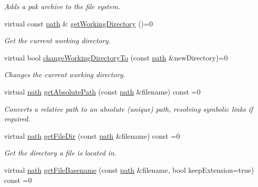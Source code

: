 \begin{DoxyCompactItemize}
\begin{DoxyCompactList}\small\item\em Adds a pak archive to the file system. \end{DoxyCompactList}\item 
virtual const \hyperlink{namespaceirr_1_1io_a6468281622ce3a1c46b72e19f32dded5}{path} \& \hyperlink{classirr_1_1io_1_1IFileSystem_acbf7342afa6e2fc9583db3e521e66e61}{get\+Working\+Directory} ()=0
\begin{DoxyCompactList}\small\item\em Get the current working directory. \end{DoxyCompactList}\item 
virtual bool \hyperlink{classirr_1_1io_1_1IFileSystem_a8859a2bed44815eeccc4fbcef189b073}{change\+Working\+Directory\+To} (const \hyperlink{namespaceirr_1_1io_a6468281622ce3a1c46b72e19f32dded5}{path} \&new\+Directory)=0
\begin{DoxyCompactList}\small\item\em Changes the current working directory. \end{DoxyCompactList}\item 
virtual \hyperlink{namespaceirr_1_1io_a6468281622ce3a1c46b72e19f32dded5}{path} \hyperlink{classirr_1_1io_1_1IFileSystem_a77191d7917349a0200f5de3ef29acd18}{get\+Absolute\+Path} (const \hyperlink{namespaceirr_1_1io_a6468281622ce3a1c46b72e19f32dded5}{path} \&filename) const =0
\begin{DoxyCompactList}\small\item\em Converts a relative path to an absolute (unique) path, resolving symbolic links if required. \end{DoxyCompactList}\item 
virtual \hyperlink{namespaceirr_1_1io_a6468281622ce3a1c46b72e19f32dded5}{path} \hyperlink{classirr_1_1io_1_1IFileSystem_ad8b7b93f32f58c1ba9a8e7cacd5de80b}{get\+File\+Dir} (const \hyperlink{namespaceirr_1_1io_a6468281622ce3a1c46b72e19f32dded5}{path} \&filename) const =0
\begin{DoxyCompactList}\small\item\em Get the directory a file is located in. \end{DoxyCompactList}\item 
virtual \hyperlink{namespaceirr_1_1io_a6468281622ce3a1c46b72e19f32dded5}{path} \hyperlink{classirr_1_1io_1_1IFileSystem_a4235989e4ec21c78f1fd1ca861980c6c}{get\+File\+Basename} (const \hyperlink{namespaceirr_1_1io_a6468281622ce3a1c46b72e19f32dded5}{path} \&filename, bool keep\+Extension=true) const =0

\end{DoxyCompactItemize}
